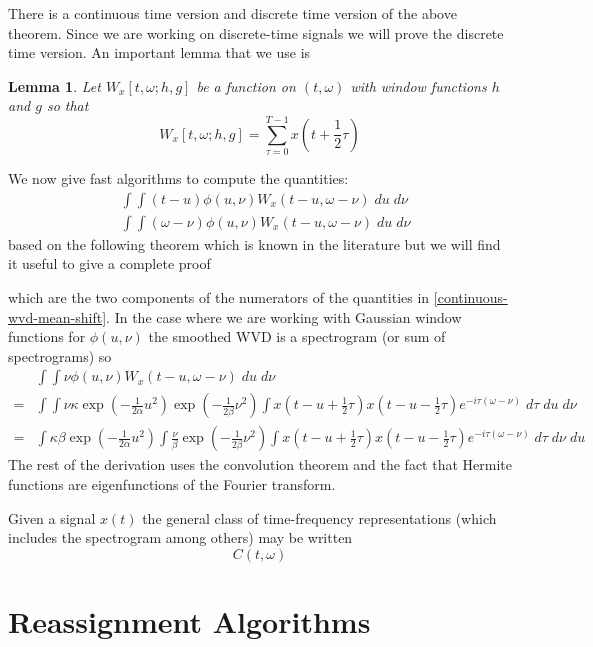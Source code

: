 \documentclass[english]{article}
\newtheorem{lem}[thm]{Lemma}
\begin{document}
There is a continuous time version and discrete time version of the above theorem. Since we 
are working on discrete-time signals we will prove the discrete
time version.  An important lemma that we use is
\begin{lem}
Let $W_x[t,\omega; h,g]$ be a function on $(t,\omega)$ with window functions $h$ and $g$ so that
\begin{equation}
W_x[t,\omega; h,g] = \sum_{\tau=0}^{T-1}x(t+\frac{1}{2}\tau)
\end{equation} 
\end{lem}

We now give fast algorithms to compute the quantities:
\begin{align}
&\int\int (t-u) \phi(u,\nu) W_x(t-u,\omega - \nu)\; du\;d\nu \\
&\int\int (\omega-\nu)\phi(u,\nu) W_x(t-u,\omega-\nu)\; du\;d\nu
\end{align}
based on the following theorem which is known in the literature \cite{auger95,cohen95} but
we will find it useful to give a complete proof

which are the two components of the numerators of the quantities in \autoref{continuous-wvd-mean-shift}.
In the case where we are working with Gaussian window functions for $\phi(u,\nu)$
the smoothed WVD is a spectrogram (or sum of spectrograms) so
\begin{align*}
&\int\int \nu \phi(u,\nu) W_x(t-u,\omega-\nu)\; du\;d\nu \\
=& \int\int \nu \kappa \exp\left(-\frac{1}{2\alpha}u^2\right) \exp\left(-\frac{1}{2\beta}\nu^2\right) \int x(t-u+\frac{1}{2}\tau)x(t-u-\frac{1}{2}\tau)e^{-i\tau(\omega-\nu)}\;d\tau\; du\;d\nu\\
=& \int \kappa\beta \exp\left(-\frac{1}{2\alpha}u^2\right) \int \frac{\nu}{\beta} \exp\left(-\frac{1}{2\beta}\nu^2\right) \int x(t-u+\frac{1}{2}\tau)x(t-u-\frac{1}{2}\tau)e^{-i\tau(\omega-\nu)}\;d\tau\;d\nu\; du
\end{align*}
The rest of the derivation uses the convolution theorem and the fact that Hermite functions are eigenfunctions
of the Fourier transform.

Given a signal $x(t)$ the general class of time-frequency representations (which includes the spectrogram among
others) \cite{cohen95} may be
written
\begin{equation}
C(t,\omega)
\end{equation}

\section{Reassignment Algorithms}
\end{document}
